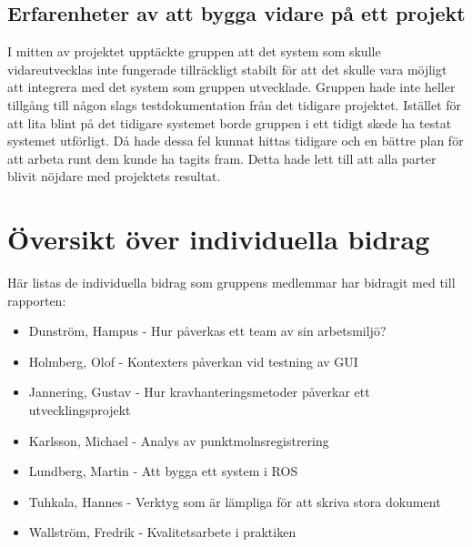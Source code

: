 \subsection{Erfarenheter av att bygga vidare på ett projekt}

I mitten av projektet upptäckte gruppen att det system som skulle vidareutvecklas inte fungerade tillräckligt stabilt för att det skulle vara möjligt att integrera med det system som gruppen utvecklade. Gruppen hade inte heller tillgång till någon slags testdokumentation från det tidigare projektet. Istället för att lita blint på det tidigare systemet borde gruppen i ett tidigt skede ha testat systemet utförligt. Då hade dessa fel kunnat hittas tidigare och en bättre plan för att arbeta runt dem kunde ha tagits fram. Detta hade lett till att alla parter blivit nöjdare med projektets resultat.




\section{Översikt över individuella bidrag}

Här listas de individuella bidrag som gruppens medlemmar har bidragit med till rapporten:

\begin{itemize}
	\item Dunström, Hampus - Hur påverkas ett team av sin arbetsmiljö?
	\item Holmberg, Olof - Kontexters påverkan vid testning av GUI
	\item Jannering, Gustav - Hur kravhanteringsmetoder påverkar ett utvecklingsprojekt
	\item Karlsson, Michael - Analys av punktmolnsregistrering
	\item Lundberg, Martin - Att bygga ett system i ROS
	\item Tuhkala, Hannes - Verktyg som är lämpliga för att skriva stora dokument
	\item Wallström, Fredrik - Kvalitetsarbete i praktiken
\end{itemize}


